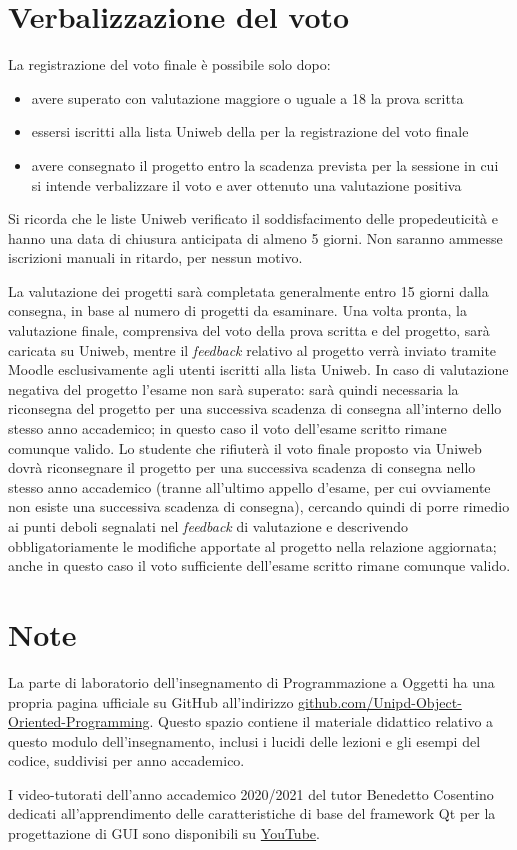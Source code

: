 \documentclass[10pt,a4paper,oneside]{article}
\begin{document}
\section{Verbalizzazione del voto}
La registrazione del voto finale è possibile solo dopo:
\begin{itemize}
 \item avere superato con valutazione maggiore o uguale a 18 la prova scritta
 \item essersi iscritti alla lista Uniweb della per la registrazione del voto finale
 \item avere consegnato il progetto entro la scadenza prevista per la sessione in cui si intende verbalizzare il voto e aver ottenuto una valutazione positiva
\end{itemize}
Si ricorda che le liste Uniweb verificato il soddisfacimento delle propedeuticità e hanno una data di chiusura anticipata di almeno 5 giorni. Non saranno ammesse iscrizioni manuali in ritardo, per nessun motivo.

La valutazione dei progetti sarà completata generalmente entro 15 giorni dalla consegna, in base al numero di progetti da esaminare. Una volta pronta, la valutazione finale, comprensiva del voto della prova scritta e del progetto, sarà caricata su Uniweb, mentre il \emph{feedback} relativo al progetto verrà inviato tramite Moodle esclusivamente agli utenti iscritti alla lista Uniweb. In caso di valutazione negativa del progetto l'esame non sarà superato: sarà quindi necessaria la riconsegna del progetto per una successiva scadenza di consegna all'interno dello stesso anno accademico; in questo caso il voto dell'esame scritto rimane comunque valido. Lo studente che rifiuterà il voto finale proposto via Uniweb dovrà riconsegnare il progetto per una successiva scadenza di consegna nello stesso anno accademico (tranne all'ultimo appello d'esame, per cui ovviamente non esiste una successiva scadenza di consegna), cercando quindi di porre rimedio ai punti deboli segnalati nel \emph{feedback} di valutazione e descrivendo obbligatoriamente le modifiche apportate al progetto nella relazione aggiornata; anche in questo caso il voto sufficiente dell'esame scritto rimane comunque valido. 



\section{Note}
La parte di laboratorio dell'insegnamento di Programmazione a Oggetti ha una propria pagina ufficiale su GitHub all'indirizzo \href{https://github.com/Unipd-Object-Oriented-Programming}{github.com/Unipd-Object-Oriented-Programming}. Questo spazio contiene il materiale didattico relativo a questo modulo dell'insegnamento, inclusi i lucidi delle lezioni e gli esempi del codice, suddivisi per anno accademico.

I video-tutorati dell'anno accademico 2020/2021 del tutor Benedetto Cosentino dedicati all'apprendimento delle caratteristiche di base del framework Qt per la progettazione di GUI sono disponibili su \href{https://www.youtube.com/playlist?list=PLH_Fd-836q-VcqWnnzsq3GOF2-0i_Az7p}{YouTube}.
\end{document}
